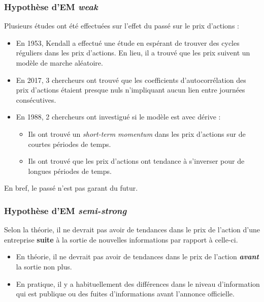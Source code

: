 \documentclass[10pt, french]{article}
\begin{document}
\begin{multicols*}{2}
\subsubsection{Hypothèse d'EM \og \textit{weak} \fg{}}
Plusieurs études ont été effectuées sur l'effet du passé sur le prix d'actions :
\begin{itemize}
	\item	En 1953, Kendall a effectué une étude en espérant de trouver des cycles réguliers dans les prix d'actions. En lieu, il a trouvé que les prix suivent un modèle de marche aléatoire.
	\item	En 2017, 3 chercheurs ont trouvé que les coefficients d'autocorrélation des prix d'actions étaient presque nuls n’impliquant aucun lien entre journées consécutives.
	\item	En 1988, 2 chercheurs ont investigué si le modèle est avec dérive :
		\begin{itemize}
			\item	Ils ont trouvé un \og \textit{short-term momentum} \fg{} dans les prix d'actions sur de courtes périodes de temps.
			\item	Ils ont trouvé que les prix d'actions ont tendance à s'inverser pour de longues périodes de temps. 
		\end{itemize}
\end{itemize}
En bref, le passé n'est pas garant du futur. 


\subsubsection{Hypothèse d'EM \og \textit{semi-strong} \fg{}}
Selon la théorie, il ne devrait pas avoir de tendances dans le prix de l'action d'une entreprise \textbf{suite} à la sortie de nouvelles informations par rapport à celle-ci.
\begin{itemize}
	\item	En théorie, il ne devrait pas avoir de tendances dans le prix de l'action \textit{\textbf{avant}} la sortie non plus. 
	\item	En pratique, il y a habituellement des différences dans le niveau d'information qui est publique ou des fuites d'informations avant l'annonce officielle.
\end{itemize}


\end{multicols*}
\end{document}
